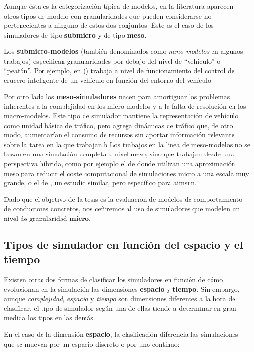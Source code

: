 Aunque ésta es la categorización típica de modelos, en la literatura aparecen otros tipos de modelo con granularidades que pueden considerarse no pertenecientes a ninguno de estos dos conjuntos. Éste es el caso de los simuladores de tipo \textbf{submicro} y de tipo \textbf{meso}.

Los \textbf{submicro-modelos} (también denominados como \textit{nano-modelos} en algunos trabajos) especifican granularidades por debajo del nivel de \enquote{vehículo} o \enquote{peatón}. Por ejemplo, en (\cite{Minderhoud1999}) trabaja a nivel de funcionamiento del control de crucero inteligente de un vehículo en función del entorno del vehículo.

Por otro lado los \textbf{meso-simuladores} nacen para amortiguar los problemas inherentes a la complejidad en los micro-modelos y a la falta de resolución en los macro-modelos. Este tipo de simulador mantiene la representación de vehículo como unidad básica de tráfico, pero agrega dinámicas de tráfico que, de otro modo, aumentarían el consumo de recursos sin aportar información relevante sobre la tarea en la que trabajan.b Los trabajos en la línea de meso-modelos no se basan en una simulación completa a nivel meso, sino que trabajan desde una perspectiva híbrida, como por ejemplo el de \cite{munoz2001integrated} donde utilizan una aproximación meso para reducir el coste computacional de simulaciones micro a una escala muy grande, o el de \cite{casas2011need}, un estudio similar, pero específico para \gls{aimsun}.

Dado que el objetivo de la tesis es la evaluación de modelos de comportamiento de conductores concretos, nos ceñiremos al uso de simuladores que modelen un nivel de granularidad \textbf{micro}.

\subsection{Tipos de simulador en función del espacio y el tiempo}

Existen otras dos formas de clasificar los simuladores en función de cómo evolucionan en la simulación las dimensiones \textbf{espacio} y  \textbf{tiempo}. Sin embargo, aunque \textit{complejidad}, \textit{espacio} y \textit{tiempo} son dimensiones diferentes a la hora de clasificar, el tipo de simulador según una de ellas tiende a determinar en gran medida los tipos en las demás.

En el caso de la dimensión \textbf{espacio}, la clasificación diferencia las simulaciones que se mueven por un espacio discreto o por uno continuo:

